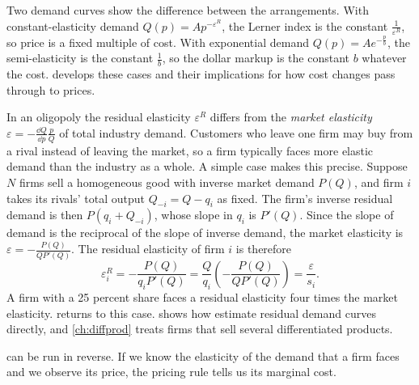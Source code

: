 Two demand curves show the difference between the arrangements. With constant-elasticity demand
$Q(p) = A p^{-\varepsilon^R}$, the Lerner index is the constant $\frac{1}{\varepsilon^R}$, so price is a fixed
multiple of cost. With exponential demand $Q(p) = A e^{-\frac{p}{b}}$, the semi-elasticity is the constant
$\frac{1}{b}$, so the dollar markup is the constant $b$ whatever the cost.  develops these cases
and their implications for how cost changes pass through to prices.

\begin{remark}\label{rem:01-residual}
In an oligopoly the residual elasticity $\varepsilon^R$ differs from the \emph{market elasticity}
$\varepsilon = -\frac{\dd Q}{\dd p}\frac{p}{Q}$ of total industry demand. Customers who leave one firm may buy
from a rival instead of leaving the market, so a firm typically faces more elastic demand than the industry as a
whole. A simple case makes this precise. Suppose $N$ firms sell a homogeneous good with inverse market demand
$P(Q)$, and firm $i$ takes its rivals' total output $Q_{-i} = Q - q_i$ as fixed. The firm's inverse residual
demand is then $P(q_i + Q_{-i})$, whose slope in $q_i$ is $P'(Q)$. Since the slope of demand is the reciprocal
of the slope of inverse demand, the market elasticity is $\varepsilon = -\frac{P(Q)}{Q P'(Q)}$. The residual
elasticity of firm $i$ is therefore
\begin{equation}\label{eq:01-residual-elasticity}
  \varepsilon^R_i = -\frac{P(Q)}{q_i P'(Q)} = \frac{Q}{q_i}\left(-\frac{P(Q)}{Q P'(Q)}\right)
  = \frac{\varepsilon}{s_i} .
\end{equation}
A firm with a 25 percent share faces a residual elasticity four times the market elasticity.
 returns to this case.  shows how \citet{BakerBresnahan1988}
estimate residual demand curves directly, and \cref{ch:diffprod} treats firms that sell several differentiated
products.
\end{remark}

 can be run in reverse. If we know the elasticity of the demand that a firm faces
and we observe its price, the pricing rule tells us its marginal cost.

